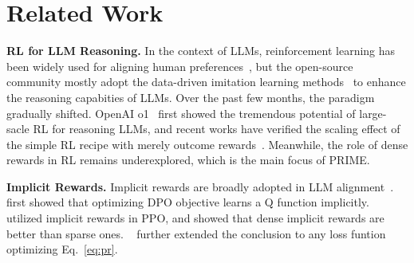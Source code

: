 \section{Related Work}
\textbf{RL for LLM Reasoning.}
In the context of LLMs, reinforcement learning has been widely used for aligning human preferences~\citep{christiano2017deep,ouyang2022training,Cui2023ULTRAFEEDBACKBL}, but the open-source community mostly adopt the data-driven imitation learning methods~\citep{Yuan2024AdvancingLR,Yue2024MAmmoTH2SI,wei2024magicoder,liu2024acemath} to enhance the reasoning capabities of LLMs.
Over the past few months, the paradigm gradually shifted. OpenAI o1~\citep{jaech2024openai} first showed the tremendous potential of large-sacle RL for reasoning LLMs, and recent works have verified the scaling effect of the simple RL recipe with merely outcome rewards~\citep{deepseekai2025deepseekr1incentivizingreasoningcapability,team2025kimi}.
Meanwhile, the role of dense rewards in RL remains underexplored, which is the main focus of PRIME.


\textbf{Implicit Rewards.}
Implicit rewards are broadly adopted in LLM alignment~\citep{rafailov2024direct,chen2024noise,Azar2023IPO,Ethayarajh2024KTOMA,Rosset2024DirectNO,chen2024bootstrapping}. ~\citet{rafailov2024r} first showed that optimizing DPO objective learns a Q function implicitly. 
\citet{zhou2024weak} utilized implicit rewards in PPO, and showed that dense implicit rewards are better than sparse ones. 
~\citet{yuan2024freeprocessrewardsprocess} further extended the conclusion to any loss funtion optimizing Eq.~\ref{eq:pr}.